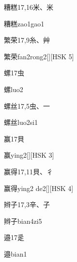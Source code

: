 \begin{entry}{糟糕}{17,16}{⽶、⽶}
  \begin{phonetics}{糟糕}{zao1gao1}
  \end{phonetics}
\end{entry}

\begin{entry}{繁荣}{17,9}{⽷、⾋}
  \begin{phonetics}{繁荣}{fan2rong2}[][HSK 5]
  \end{phonetics}
\end{entry}

\begin{entry}{螺}{17}{⾍}
  \begin{phonetics}{螺}{luo2}
  \end{phonetics}
\end{entry}

\begin{entry}{螺丝}{17,5}{⾍、⼀}
  \begin{phonetics}{螺丝}{luo2si1}
  \end{phonetics}
\end{entry}

\begin{entry}{赢}{17}{⾙}
  \begin{phonetics}{赢}{ying2}[][HSK 3]
  \end{phonetics}
\end{entry}

\begin{entry}{赢得}{17,11}{⾙、⼻}
  \begin{phonetics}{赢得}{ying2 de2}[][HSK 4]
  \end{phonetics}
\end{entry}

\begin{entry}{辫子}{17,3}{⾟、⼦}
  \begin{phonetics}{辫子}{bian4zi5}
  \end{phonetics}
\end{entry}

\begin{entry}{邉}{17}{⾡}
  \begin{phonetics}{邉}{bian1}
  \end{phonetics}
\end{entry}

